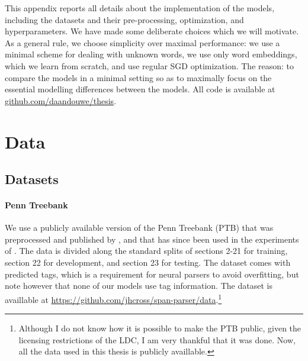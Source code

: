 % 

This appendix reports all details about the implementation of the models, including the datasets and their pre-processing, optimization, and hyperparameters. We have made some deliberate choices which we will motivate. As a general rule, we choose simplicity over maximal performance: we use a minimal scheme for dealing with unknown words, we use only word embeddings, which we learn from scratch, and use regular SGD optimization. The reason: to compare the models in a minimal setting so as to maximally focus on the essential modelling differences between the models. All code is available at \url{github.com/daandouwe/thesis}.

\section{Data}

\subsection{Datasets}

\paragraph{Penn Treebank}
We use a publicly available version of the Penn Treebank (PTB) that was preprocessed and published by \citet{cross2016span}, and that has since been used in the experiments of \citet{stern2017minimal,kitaev2018attentive}. The data is divided along the standard splits of sections 2-21 for training, section 22 for development, and section 23 for testing. The dataset comes with predicted tags, which is a requirement for neural parsers to avoid overfitting, but note however that none of our models use tag information. The dataset is availlable at \url{https://github.com/jhcross/span-parser/data}.\footnote{Although I do not know how it is possible to make the PTB public, given the licensing restrictions of the LDC, I am very thankful that it was done. Now, all the data used in this thesis is publicly availlable.}

